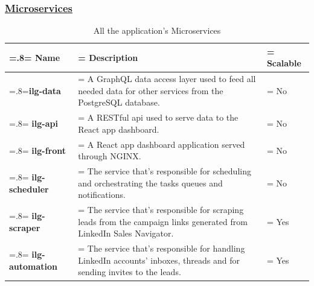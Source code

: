 \subsubsection*{\underline{Microservices}}
\begin{table}[H]
	\renewcommand{\arraystretch}{1.5}%
	\caption{All the application's Microservices}
	\centering
	\medskip
	\begin{tabularx}{1\textwidth} {
			| >{\hsize=.8\hsize\linewidth=\hsize\centering\arraybackslash}X
			| >{\hsize=1.75\hsize\linewidth=\hsize\justifying\arraybackslash}X
			| >{\hsize=0.45\hsize\linewidth=\hsize\centering\arraybackslash}X |}
		\hline
		\rowcolor{primary} \textbf{Name} & \noindent \textbf{Description}                                                                                                  & \textbf{Scalable} \\
		\hline
		\textbf {ilg-data}               & \noindent A GraphQL data access layer used to feed all needed data for other services from the PostgreSQL database.             & No                \\
		\hline
		\textbf {ilg-api}                & \noindent A RESTful api used to serve data to the React app dashboard.                                                          & No                \\
		\hline
		\textbf {ilg-front}              & \noindent A React app dashboard application served through NGINX.                                                               & No                \\
		\hline
		\textbf {ilg-scheduler}          & \noindent The service that's responsible for scheduling and orchestrating the tasks queues and notifications.                   & No                \\
		\hline
		\textbf {ilg-scraper}            & \noindent The service that's responsible for scraping leads from the campaign links generated from LinkedIn Sales Navigator.    & Yes               \\
		\hline
		\textbf {ilg-automation}         & \noindent The service that's responsible for handling LinkedIn accounts' inboxes, threads and for sending invites to the leads. & Yes               \\
		\hline
	\end{tabularx}
\end{table}

